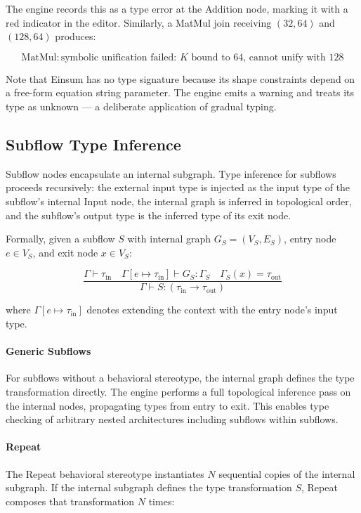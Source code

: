\documentclass[11pt,a4paper]{article}
\begin{document}
The engine records this as a type error at the Addition node, marking it with a red indicator in the editor. Similarly, a MatMul join receiving $(32, 64)$ and $(128, 64)$ produces:

\[
\text{MatMul}: \text{symbolic unification failed: } K \text{ bound to 64, cannot unify with 128}
\]

Note that Einsum has no type signature because its shape constraints depend on a free-form equation string parameter. The engine emits a warning and treats its type as unknown --- a deliberate application of gradual typing.

\subsection{Subflow Type Inference}

Subflow nodes encapsulate an internal subgraph. Type inference for subflows proceeds recursively: the external input type is injected as the input type of the subflow's internal Input node, the internal graph is inferred in topological order, and the subflow's output type is the inferred type of its exit node.

Formally, given a subflow $S$ with internal graph $G_S = (V_S, E_S)$, entry node $e \in V_S$, and exit node $x \in V_S$:

\[
\frac{
\Gamma \vdash \tau_{\text{in}} \quad
\Gamma[e \mapsto \tau_{\text{in}}] \vdash G_S : \Gamma_S \quad
\Gamma_S(x) = \tau_{\text{out}}
}{
\Gamma \vdash S : (\tau_{\text{in}} \rightarrow \tau_{\text{out}})
}
\]

where $\Gamma[e \mapsto \tau_{\text{in}}]$ denotes extending the context with the entry node's input type.

\paragraph{Generic Subflows}

For subflows without a behavioral stereotype, the internal graph defines the type transformation directly. The engine performs a full topological inference pass on the internal nodes, propagating types from entry to exit. This enables type checking of arbitrary nested architectures including subflows within subflows.

\paragraph{Repeat}

The Repeat behavioral stereotype instantiates $N$ sequential copies of the internal subgraph. If the internal subgraph defines the type transformation $S$, Repeat composes that transformation $N$ times:
\end{document}
